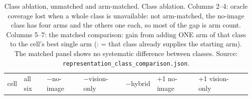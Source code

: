 \begin{table}[tp]
\centering
\caption{Class ablation, unmatched and arm-matched. Class ablation. Columns 2--4: oracle coverage lost when a whole class is unavailable: not arm-matched, the no-image class has four arms and the others one each, so most of the gap is arm count. Columns 5--7: the matched comparison: gain from adding ONE arm of that class to the cell's best single arm (: = that class already supplies the starting arm). The matched panel shows no systematic difference between classes. Source: \texttt{representation\_class\_comparison.json}.}
\label{tab:t04}
\footnotesize
\setlength{\tabcolsep}{3pt}
\begin{tabular}{@{}
  >{\raggedright\arraybackslash}p{}
  >{\raggedright\arraybackslash}p{}
  >{\raggedright\arraybackslash}p{}
  >{\raggedright\arraybackslash}p{}
  >{\raggedright\arraybackslash}p{}
  >{\raggedright\arraybackslash}p{}
  >{\raggedright\arraybackslash}p{}
  >{\raggedright\arraybackslash}p{}@{}}
\toprule
\begin{minipage}[b]{\linewidth}\raggedright
cell
\end{minipage} & \begin{minipage}[b]{\linewidth}\raggedright
all six
\end{minipage} & \begin{minipage}[b]{\linewidth}\raggedright
−no-image
\end{minipage} & \begin{minipage}[b]{\linewidth}\raggedright
−vision-only
\end{minipage} & \begin{minipage}[b]{\linewidth}\raggedright
−hybrid
\end{minipage} & \begin{minipage}[b]{\linewidth}\raggedright
+1 no-image
\end{minipage} & \begin{minipage}[b]{\linewidth}\raggedright
+1 vision-only
\end{minipage} & \begin{minipage}[b]{\linewidth}\raggedright

\end{minipage}
\end{tabular}
\end{table}
